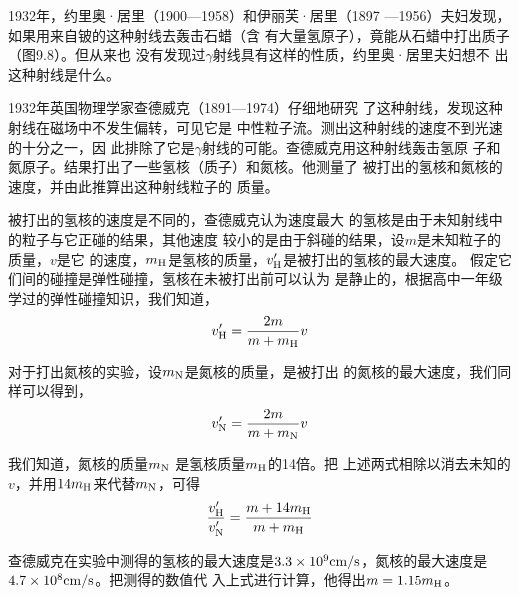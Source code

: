 1932年，约里奥·居里（1900—1958）和伊丽芙·居里（1897
—1956）夫妇发现，如果用来自铍的这种射线去轰击石蜡（含
有大量氢原子），竟能从石蜡中打出质子（图9.8）。但从来也
没有发现过$\gamma$射线具有这样的性质，约里奥·居里夫妇想不
出这种射线是什么。
\begin{figure}[htp]\centering
{}
\caption{}
\end{figure}

1932年英国物理学家查德威克（1891—1974）仔细地研究
了这种射线，发现这种射线在磁场中不发生偏转，可见它是
中性粒子流。测出这种射线的速度不到光速的十分之一，因
此排除了它是$\gamma$射线的可能。查德威克用这种射线轰击氢原
子和氮原子。结果打出了一些氢核（质子）和氮核。他测量了
被打出的氢核和氮核的速度，并由此推算出这种射线粒子的
质量。

被打出的氢核的速度是不同的，查德威克认为速度最大
的氢核是由于未知射线中的粒子与它正碰的结果，其他速度
较小的是由于斜碰的结果，设$m$是未知粒子的质量，$v$是它
的速度，$m_{\rm H}$是氢核的质量，$v'_{\rm H}$是被打出的氢核的最大速度。
假定它们间的碰撞是弹性碰撞，氢核在未被打出前可以认为
是静止的，根据高中一年级学过的弹性碰撞知识，我们知道，
\[ v'_{\rm H}=\frac{2m}{m+m_{\rm H}}v \]

对于打出氮核的实验，设$m_{\rm N}$是氮核的质量，是被打出
的氮核的最大速度，我们同样可以得到，
\[ v'_{\rm N}=\frac{2m}{m+m_{\rm N}}v\]

我们知道，氮核的质量$m_{\rm N}$
是氢核质量$m_{\rm H}$的14倍。把
上述两式相除以消去未知的$v$，并用$14m_{\rm H}$来代替$m_{\rm N}$，可得
\[ \frac{v'_{\rm H}}{v'_{\rm N}} =\frac{m+14m_{\rm H}}{m+m_{\rm H}}\]

查德威克在实验中测得的氢核的最大速度是$3.3\times10^9{\rm cm}/{\rm s}$，氮核的最大速度是$4.7\times10^8{\rm cm}/{\rm s}$。把测得的数值代
入上式进行计算，他得出$m=1.15m_{\rm H}$。


